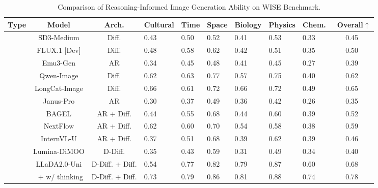 \begin{table}[!tb]
\centering
\renewcommand{\arraystretch}{1.2}
\setlength\tabcolsep{1pt}
\small
{}
\vspace{-0.1in}
\caption{Comparison of Reasoning-Informed Image Generation Ability on WISE Benchmark.}
\begin{tabularx}{\linewidth}{ccc| *{6}{C} |c} 
\toprule
\textbf{Type} & \textbf{Model} & \textbf{Arch.} & \textbf{Cultural} & \textbf{Time} & \textbf{Space} & \textbf{Biology} & \textbf{Physics} & \textbf{Chem.} & \textbf{~Overall$\uparrow$} \\
\midrule
{} 
& SD3-Medium & Diff. &0.43 &0.50 &0.52 &0.41 &0.53 &0.33 &0.45 \\
& FLUX.1 [Dev] & Diff. & 0.48 & 0.58 & 0.62 & 0.42 & 0.51 & 0.35 & 0.50 \\
& Emu3-Gen & AR &0.34 &0.45 &0.48 &0.41 &0.45 &0.27 &0.39 \\
& Qwen-Image & Diff. &0.62 &0.63 &0.77 &0.57 &0.75 &0.40 &0.62 \\
& LongCat-Image &Diff. &0.66 &0.61 &0.72 &0.66 &0.72 &0.49 &0.65 \\

\midrule
{} 
& Janus-Pro & AR & 0.30 & 0.37 & 0.49 & 0.36 & 0.42 & 0.26 & 0.35 \\
& BAGEL & AR + Diff. & 0.44 & 0.55 & 0.68 & 0.44 & 0.60 & 0.39 & 0.52 \\
& NextFlow & AR + Diff. &0.62 &0.60 &0.70 &0.54 &0.58 &0.38 &0.59 \\
&InternVL-U & AR + Diff. &0.37 &0.51 &0.68 &0.39 &0.62 &0.39 &0.46 \\
& Lumina-DiMOO & D-Diff. & 0.35 & 0.43 &0.59 &0.31 &0.49 &0.34 &0.40 \\
&LLaDA2.0-Uni &D-Diff. + Diff. &0.54 &0.77 &0.82 &0.79 &0.87 &0.60 &0.68 \\
&~+ w/ thinking & D-Diff. + Diff. & 0.73  & 0.79 & 0.86 & 0.81 & 0.88 & 0.74 & 0.78 \\
\bottomrule
\end{tabularx}
\label{table:wise_benchmark}
\vspace{-0.06in}
\end{table}